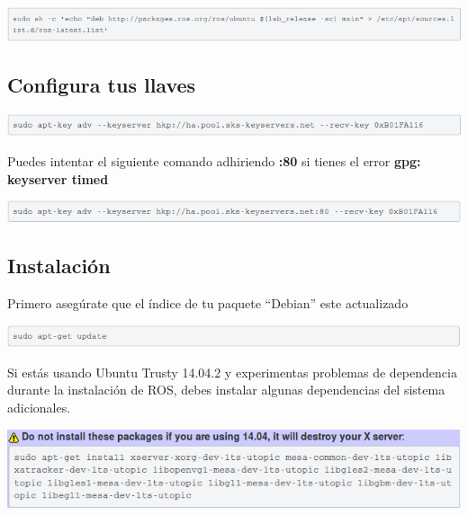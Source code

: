 \documentclass[user_manual.tex]{subfiles}
\begin{document}
\begin{center}
\includegraphics[width=1\textwidth]{Figures/Software/Install_ROS/Paso_1.png}
\end{center}

\subsection{Configura tus llaves}

\begin{center}
\includegraphics[width=1\textwidth]{Figures/Software/Install_ROS/Paso_2.png}
\end{center}

Puedes intentar el siguiente comando adhiriendo \textbf{:80} si tienes el error \textbf{gpg: keyserver timed}

\begin{center}
\includegraphics[width=1\textwidth]{Figures/Software/Install_ROS/Paso_3.png}
\end{center}

\subsection{Instalación}
Primero asegúrate que el índice de tu paquete ``Debian'' este actualizado

\begin{center}
\includegraphics[width=1\textwidth]{Figures/Software/Install_ROS/Paso_4.png}
\end{center}

Si estás usando Ubuntu Trusty 14.04.2 y experimentas problemas de dependencia durante la instalación de ROS, debes 
instalar algunas dependencias del sistema adicionales.

\begin{center}
\includegraphics[width=1\textwidth]{Figures/Software/Install_ROS/Paso_5.png}
\end{center}
\end{document}

